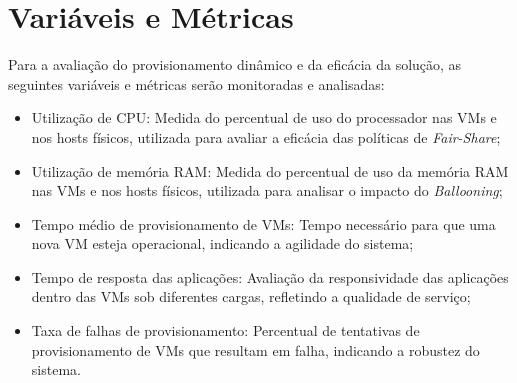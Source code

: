 \section{Variáveis e Métricas}
Para a avaliação do provisionamento dinâmico e da eficácia da solução, as seguintes variáveis e métricas serão monitoradas e analisadas:
\begin{itemize}
\item Utilização de CPU: Medida do percentual de uso do processador nas VMs e nos hosts físicos, utilizada para avaliar a eficácia das políticas de \textit{Fair-Share};
\item Utilização de memória RAM: Medida do percentual de uso da memória RAM nas VMs e nos hosts físicos, utilizada para analisar o impacto do \textit{Ballooning};
\item Tempo médio de provisionamento de VMs: Tempo necessário para que uma nova VM esteja operacional, indicando a agilidade do sistema;
\item Tempo de resposta das aplicações: Avaliação da responsividade das aplicações dentro das VMs sob diferentes cargas, refletindo a qualidade de serviço;
\item Taxa de falhas de provisionamento: Percentual de tentativas de provisionamento de VMs que resultam em falha, indicando a robustez do sistema.
\end{itemize}
